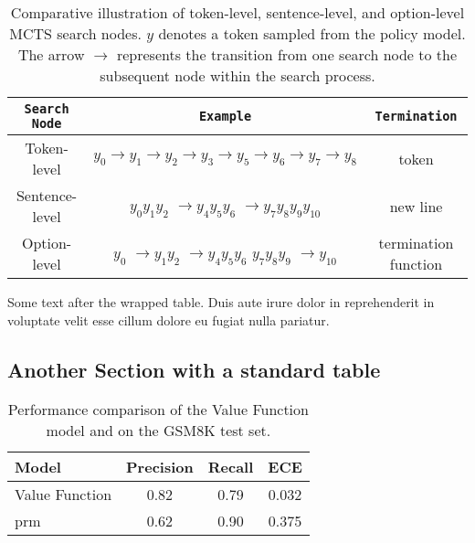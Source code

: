 \documentclass{article}
\begin{document}
\begin{table}[!htb]
\footnotesize
    \centering
    \setlength{\tabcolsep}{4pt}
    \begin{tabular}{c|c|c}

    \toprule
    \texttt{Search Node} & \texttt{Example} & \texttt{Termination}  \\
    \midrule
    Token-level & $y_0 \rightarrow y_1 \rightarrow y_2 \rightarrow y_3 \rightarrow y_5 \rightarrow y_6 \rightarrow y_7 \rightarrow y_8$ &  token\\
    \midrule
    Sentence-level & $y_0 y_1 y_2$ \enterkey{}  $\rightarrow y_4 y_5 y_6$ \enterkey{} $\rightarrow y_7 y_8 y_9 y_{10}$ & new line\\
    \midrule
    Option-level & $y_0$  $\rightarrow y_1 y_2$ \enterkey{} $\rightarrow y_4 y_5 y_6$ \enterkey{} $y_7 y_8 y_9$ \enterkey{} $\rightarrow y_{10}$& termination function\\
    \bottomrule
    \end{tabular}
    \vspace{2mm}
    \caption{Comparative illustration of token-level, sentence-level, and option-level MCTS search nodes. $y$ denotes a token sampled from the policy model. The arrow $\rightarrow$ represents the transition from one search node to the subsequent node within the search process.}
    \label{tab:option}
\end{table}


Some text after the wrapped table. Duis aute irure dolor in reprehenderit in voluptate velit esse cillum dolore eu fugiat nulla pariatur.

\subsection{Another Section with a standard table}
\begin{table}[!htb]
    \centering
    \begin{tabular}{l|c|c|c}
        Model               & Precision & Recall & ECE \\
        \hline
        Value Function      & 0.82      & 0.79   & 0.032 \\
        prm              & 0.62      & 0.90   & 0.375 \\
        \hline
    \end{tabular}
    \vspace{4mm}
    \caption{Performance comparison of the Value Function model and \prm{} on the GSM8K test set.}
    \label{table:ablation_critic_example}
\end{table}
% 
\end{document}
